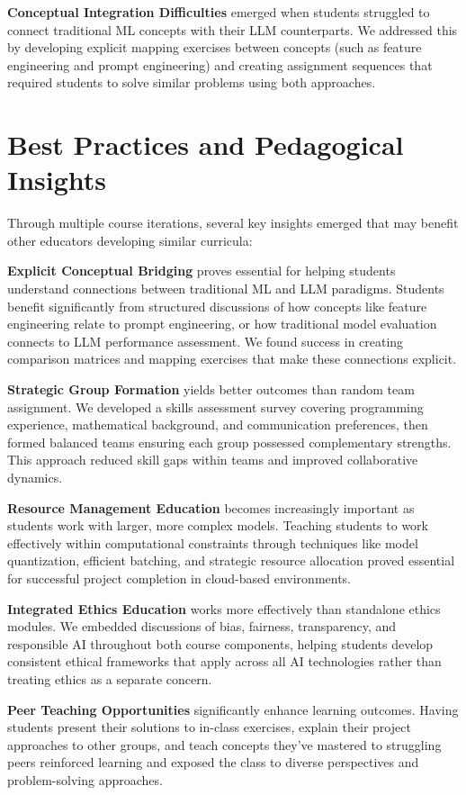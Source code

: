 \documentclass{article}
\begin{document}
\textbf{Conceptual Integration Difficulties} emerged when students struggled to connect traditional ML concepts with their LLM counterparts. We addressed this by developing explicit mapping exercises between concepts (such as feature engineering and prompt engineering) and creating assignment sequences that required students to solve similar problems using both approaches.

\section{Best Practices and Pedagogical Insights}

Through multiple course iterations, several key insights emerged that may benefit other educators developing similar curricula:

\textbf{Explicit Conceptual Bridging} proves essential for helping students understand connections between traditional ML and LLM paradigms. Students benefit significantly from structured discussions of how concepts like feature engineering relate to prompt engineering, or how traditional model evaluation connects to LLM performance assessment. We found success in creating comparison matrices and mapping exercises that make these connections explicit.

\textbf{Strategic Group Formation} yields better outcomes than random team assignment. We developed a skills assessment survey covering programming experience, mathematical background, and communication preferences, then formed balanced teams ensuring each group possessed complementary strengths. This approach reduced skill gaps within teams and improved collaborative dynamics.

\textbf{Resource Management Education} becomes increasingly important as students work with larger, more complex models. Teaching students to work effectively within computational constraints through techniques like model quantization, efficient batching, and strategic resource allocation proved essential for successful project completion in cloud-based environments.

\textbf{Integrated Ethics Education} works more effectively than standalone ethics modules. We embedded discussions of bias, fairness, transparency, and responsible AI throughout both course components, helping students develop consistent ethical frameworks that apply across all AI technologies rather than treating ethics as a separate concern.

\textbf{Peer Teaching Opportunities} significantly enhance learning outcomes. Having students present their solutions to in-class exercises, explain their project approaches to other groups, and teach concepts they've mastered to struggling peers reinforced learning and exposed the class to diverse perspectives and problem-solving approaches.
\end{document}
